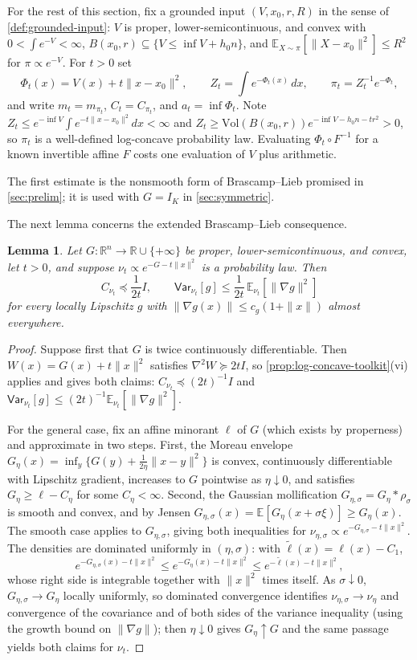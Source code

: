 \documentclass[11pt]{article}
\numberwithin{equation}{section}
\newtheorem{lemma}{Lemma}[section]
\theoremstyle{definition}
\newcommand{\R}{\mathbb{R}}
\newcommand{\Vol}{\mathrm{Vol}}
\newcommand{\E}[2]{\mathbb{E}_{#1}\left[#2\right]}
\newcommand{\V}[2]{\mathsf{Var}_{#1}\left[#2\right]}
\renewcommand{\tilde}{\widetilde}
\begin{document}
For the rest of this section, fix a grounded input $(V,x_0,r,R)$ in the sense of
\cref{def:grounded-input}:
$V$ is proper, lower-semicontinuous, and convex with
$0<\int e^{-V}<\infty$,
$B(x_0,r)\subseteq\{V\leq\inf V+h_0n\}$, and
$\E{X\sim\pi}{\|X-x_0\|^2}\leq R^2$ for
$\pi\propto e^{-V}$.
For $t>0$ set
\[
\Phi_t(x)=V(x)+t\|x-x_0\|^2,
\qquad
Z_t=\int e^{-\Phi_t(x)}\,dx,
\qquad
\pi_t=Z_t^{-1}e^{-\Phi_t},
\]
and write $m_t=m_{\pi_t}$,
$C_t=C_{\pi_t}$, and
$a_t=\inf\Phi_t$.
Note $Z_t\leq e^{-\inf V}\int e^{-t\|x-x_0\|^2}dx<\infty$ and
$Z_t\geq\Vol(B(x_0,r))e^{-\inf V-h_0n-tr^2}>0$, so
$\pi_t$ is a well-defined log-concave probability law.
Evaluating $\Phi_t\circ F^{-1}$ for a known invertible affine
$F$ costs one evaluation of
$V$ plus arithmetic.

The first estimate is the nonsmooth form of Brascamp--Lieb promised in
\cref{sec:prelim}; it is used with $G=I_K$ in \cref{sec:symmetric}.

The next lemma concerns the extended Brascamp--Lieb consequence.

\begin{lemma}
\label{lem:bl}
Let $G:\R^n\to\R\cup\{+\infty\}$ be proper, lower-semicontinuous, and convex,
let
$t>0$, and suppose
$\nu_t\propto e^{-G-t\|x\|^2}$ is a probability law.
Then
\[
C_{\nu_t}\preceq\frac1{2t}I,
\qquad
\V{\nu_t}{g}\leq\frac1{2t}\,\E{\nu_t}{\|\nabla g\|^2}
\]
for every locally Lipschitz $g$ with
$\|\nabla g(x)\|\leq c_g(1+\|x\|)$ almost everywhere.
\end{lemma}

\begin{proof}
Suppose first that $G$ is twice continuously differentiable.
Then $W(x)=G(x)+t\|x\|^2$ satisfies
$\nabla^2W\succeq2tI$, so \cref{prop:log-concave-toolkit}(vi) applies and gives
both claims:
$C_{\nu_t}\preceq(2t)^{-1}I$ and
$\V{\nu_t}{g}\leq(2t)^{-1}\E{\nu_t}{\|\nabla g\|^2}$.

For the general case, fix an affine minorant $\ell$ of
$G$ (which exists by properness) and approximate in two steps.
First, the Moreau envelope $G_\eta(x)=\inf_y\{G(y)+\frac1{2\eta}\|x-y\|^2\}$ is
convex, continuously differentiable with Lipschitz gradient, increases to
$G$ pointwise as
$\eta\downarrow0$, and satisfies
$G_\eta\geq\ell-C_\eta$ for some
$C_\eta<\infty$.
Second, the Gaussian mollification $G_{\eta,\sigma}=G_\eta*\rho_\sigma$ is
smooth and convex, and by Jensen
$G_{\eta,\sigma}(x)=\E{}{G_\eta(x+\sigma\xi)}\geq G_\eta(x)$.
The smooth case applies to $G_{\eta,\sigma}$, giving both inequalities for
$\nu_{\eta,\sigma}\propto e^{-G_{\eta,\sigma}-t\|x\|^2}$.
The densities are dominated uniformly in $(\eta,\sigma)$: with
$\tilde\ell(x)=\ell(x)-C_1$,
\[
e^{-G_{\eta,\sigma}(x)-t\|x\|^2}
\leq e^{-G_\eta(x)-t\|x\|^2}
\leq e^{-\tilde\ell(x)-t\|x\|^2},
\]
whose right side is integrable together with $\|x\|^2$ times itself.
As $\sigma\downarrow0$,
$G_{\eta,\sigma}\to G_\eta$ locally uniformly, so dominated convergence
identifies
$\nu_{\eta,\sigma}\to\nu_\eta$ and convergence of the covariance and of both
sides of the variance inequality (using the growth bound on
$\|\nabla g\|$); then
$\eta\downarrow0$ gives
$G_\eta\uparrow G$ and the same passage yields both claims for
$\nu_t$.
\end{proof}
\end{document}
